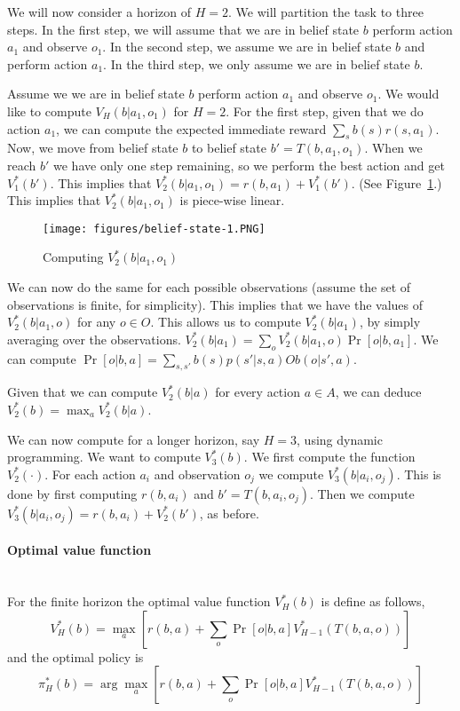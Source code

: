 We will now consider a horizon of $H=2$. We will partition the task
to three steps. In the first step, we will assume that we are in
belief state $b$ perform action $a_1$ and observe $o_1$. In the
second step, we assume we are in belief state $b$ and perform action
$a_1$. In the third step, we only assume we are in belief state $b$.

Assume we  we are in belief state $b$ perform action $a_1$ and
observe $o_1$. We would like to compute $V_H(b|a_1,o_1)$ for $H=2$.
For the first step, given that we do action $a_1$, we can compute
the expected immediate reward $\sum_s b(s)r(s,a_1)$. Now, we move
from belief state $b$ to belief state $b'=T(b,a_1,o_1)$. When we
reach $b'$ we have only one step remaining, so we perform the best
action and get $V^*_1(b')$. This implies that
$V^*_2(b|a_1,o_1)=r(b,a_1)+V^*_1(b')$. (See
Figure~\ref{fig:belief-state-1}.) This implies that
$V^*_2(b|a_1,o_1)$ is piece-wise linear.

\begin{figure}
  \begin{centering}
  \texttt{[image: figures/belief-state-1.PNG]}\\
  \caption{Computing $V^*_2(b|a_1,o_1)$}\label{fig:belief-state-1}
  \end{centering}
\end{figure}

We can now do the same for each possible observations (assume the
set of observations is finite, for simplicity). This implies that we
have the values of $V^*_2(b|a_1,o)$ for any $o\in O$. This allows us
to compute $V^*_2(b|a_1)$, by simply averaging over the
observations. $V^*_2(b|a_1)=\sum_o V^*_2(b|a_1,o)\Pr[o|b,a_1]$. We
can compute $\Pr[o|b,a]=\sum_{s,s'} b(s)p(s'|s,a)Ob(o|s',a)$.

Given that we can compute $V_2^*(b|a)$ for every action $a\in A$, we
can deduce $V_2^*(b)=\max_a V_2^*(b|a)$.

We can now compute for a longer horizon, say $H=3$, using dynamic
programming. We want to compute $V^*_3(b)$. We first compute the
function $V_2^*(\cdot)$. For each action $a_i$ and observation $o_j$
we compute $V^*_3(b|a_i,o_j)$. This is done by first computing
$r(b,a_i)$ and $b'=T(b,a_i,o_j)$. Then we compute $V^*_3(b|a_i,o_j)
= r(b,a_i)+V^*_2(b')$, as before.

\paragraph{Optimal value function}\ \\
For the finite horizon the optimal value function $V^*_H(b)$ is
define as follows,
\[
V^*_H(b)=\max_a [r(b,a)+\sum_o \Pr[o|b,a]V^*_{H-1}(T(b,a,o))]
\]
and the optimal policy is
\[
\pi_H^*(b)=\arg\max_a [r(b,a)+\sum_o \Pr[o|b,a]V^*_{H-1}(T(b,a,o))]
\]

